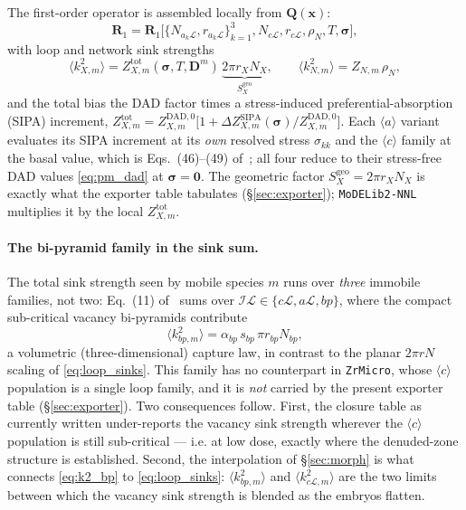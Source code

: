 \documentclass[11pt]{article}
\newcommand{\Rone}{\mathbf{R}_{1}}
\newcommand{\sig}{\bm{\sigma}}
\newcommand{\Lcal}{\mathcal{L}}
\newcommand{\ZrMicro}{\texttt{ZrMicro}}
\newcommand{\MoDELib}{\texttt{MoDELib2-NNL}}
\begin{document}
The first-order operator is assembled locally from $\mathbf Q(\mathbf x)$:
\begin{equation}
\label{eq:R1_local}
    \Rone = \Rone\big[\{N_{a_k\Lcal},r_{a_k\Lcal}\}_{k=1}^3, N_{c\Lcal},r_{c\Lcal},\rho_N,T,\sig\big],
\end{equation}
with loop and network sink strengths
\begin{equation}
\label{eq:loop_sinks}
    \langle k^2_{X,m}\rangle
    =
    Z_{X,m}^{\mathrm{tot}}(\sig,T,\mathbf D^m)\,\underbrace{2\pi r_{X}N_{X}}_{S^{\mathrm{geo}}_X},
    \qquad
    \langle k^2_{N,m}\rangle = Z_{N,m}\,\rho_N,
\end{equation}
and the total bias the DAD factor times a stress-induced preferential-absorption
(SIPA) increment,
$Z_{X,m}^{\mathrm{tot}}=Z_{X,m}^{\mathrm{DAD},0}\big[1+\Delta Z^{\mathrm{SIPA}}_{X,m}(\sig)/Z_{X,m}^{\mathrm{DAD},0}\big]$.
Each $\langle a\rangle$ variant evaluates its SIPA increment at its \emph{own}
resolved stress $\sigma_{kk}$ and the $\langle c\rangle$ family at the basal
value, which is Eqs.~(46)--(49) of~\cite{PoGhoniem2026D1M1}; all four reduce to
their stress-free DAD values \eqref{eq:pm_dad} at $\sig=\mathbf0$. The geometric
factor $S^{\mathrm{geo}}_X=2\pi r_X N_X$ is exactly what the exporter table
tabulates (\S\ref{sec:exporter}); \MoDELib{} multiplies it by the local
$Z_{X,m}^{\mathrm{tot}}$.

\paragraph{The bi-pyramid family in the sink sum.}
The total sink strength seen by mobile species $m$ runs over \emph{three}
immobile families, not two: Eq.~(11) of~\cite{PoGhoniem2026D1M1} sums over
$\mathcal I\!\Lcal\in\{c\Lcal,a\Lcal,bp\}$, where the compact sub-critical
vacancy bi-pyramids contribute
\begin{equation}
\label{eq:k2_bp}
    \langle k^2_{bp,m}\rangle=\alpha_{bp}\,s_{bp}\,\pi r_{bp}N_{bp},
\end{equation}
a volumetric (three-dimensional) capture law, in contrast to the planar
$2\pi r N$ scaling of \eqref{eq:loop_sinks}. This family has no counterpart in
\ZrMicro{}, whose $\langle c\rangle$ population is a single loop family, and it
is \emph{not} carried by the present exporter table (\S\ref{sec:exporter}). Two
consequences follow. First, the closure table as currently written under-reports
the vacancy sink strength wherever the $\langle c\rangle$ population is still
sub-critical --- i.e. at low dose, exactly where the denuded-zone structure is
established. Second, the interpolation of \S\ref{sec:morph} is what connects
\eqref{eq:k2_bp} to \eqref{eq:loop_sinks}: $\langle k^2_{bp,m}\rangle$ and
$\langle k^2_{c\Lcal,m}\rangle$ are the two limits between which the vacancy
sink strength is blended as the embryos flatten.
\end{document}
